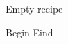 \begin{recipe}
[ %
    preparationtime = {\unit[45]{min}},
    portion = {\portion{4}},
]
{Empty recipe}

    \ingredients
    {%
    }

    \preparation
    {%
	    \step Begin
	    \step Eind
    }
    
\end{recipe}
